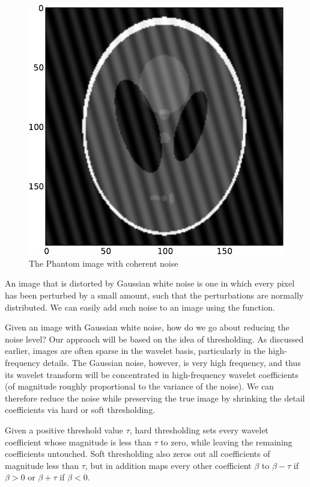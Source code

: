 \begin{figure}[t]
    \includegraphics[width=\linewidth]{phantom_coherent.pdf}
    \caption{The Phantom image with coherent noise}
    \label{fig:coherent}
\endminipage
\end{figure}

An image that is distorted by Gaussian white noise is one in which
every pixel has been perturbed by a small amount, such that the
perturbations are normally distributed. We can easily add such noise
to an image using the  function.

Given an image with Gaussian white noise, how do we go about reducing
the noise level? Our approach will be based on the idea of thresholding.
As discussed earlier, images are often sparse in the wavelet basis,
particularly in the high-frequency details. The Gaussian noise, however,
is very high frequency, and thus its wavelet transform will be
concentrated in high-frequency wavelet coefficients (of magnitude
roughly proportional to the variance of the noise). We can therefore
reduce the noise while preserving the true image by shrinking the
detail coefficients via hard or soft thresholding.

Given a positive threshold value $\tau$, hard thresholding sets
every wavelet coefficient whose magnitude is less than $\tau$ to
zero, while leaving the remaining coefficients untouched. Soft
thresholding also zeros out all coefficients of magnitude less than
$\tau$, but in addition maps every other coefficient $\beta$ to
$\beta - \tau$ if $\beta > 0$ or $\beta + \tau$ if $\beta < 0$.

